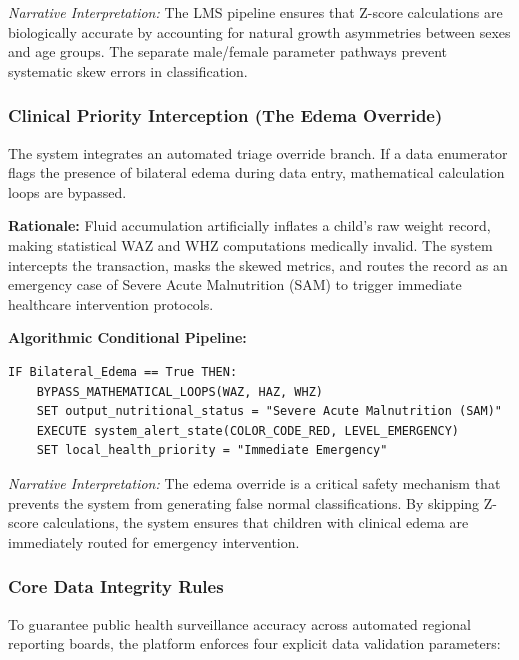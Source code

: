 \documentclass[12pt, a4paper]{report}
\begin{document}
\textit{Narrative Interpretation:} The LMS pipeline ensures that Z-score calculations are biologically accurate by accounting for natural growth asymmetries between sexes and age groups. The separate male/female parameter pathways prevent systematic skew errors in classification.

\subsubsection{Clinical Priority Interception (The Edema Override)}
\label{subsubsec:edema}
The system integrates an automated triage override branch. If a data enumerator flags the presence of bilateral edema during data entry, mathematical calculation loops are bypassed.

\noindent \textbf{Rationale:} Fluid accumulation artificially inflates a child's raw weight record, making statistical WAZ and WHZ computations medically invalid. The system intercepts the transaction, masks the skewed metrics, and routes the record as an emergency case of Severe Acute Malnutrition (SAM) to trigger immediate healthcare intervention protocols.

\noindent \textbf{Algorithmic Conditional Pipeline:}
\begin{verbatim}
IF Bilateral_Edema == True THEN:
    BYPASS_MATHEMATICAL_LOOPS(WAZ, HAZ, WHZ)
    SET output_nutritional_status = "Severe Acute Malnutrition (SAM)"
    EXECUTE system_alert_state(COLOR_CODE_RED, LEVEL_EMERGENCY)
    SET local_health_priority = "Immediate Emergency"
\end{verbatim}

\textit{Narrative Interpretation:} The edema override is a critical safety mechanism that prevents the system from generating false normal classifications. By skipping Z-score calculations, the system ensures that children with clinical edema are immediately routed for emergency intervention.

\subsubsection{Core Data Integrity Rules}
\label{subsubsec:integrity}
To guarantee public health surveillance accuracy across automated regional reporting boards, the platform enforces four explicit data validation parameters:
\end{document}
